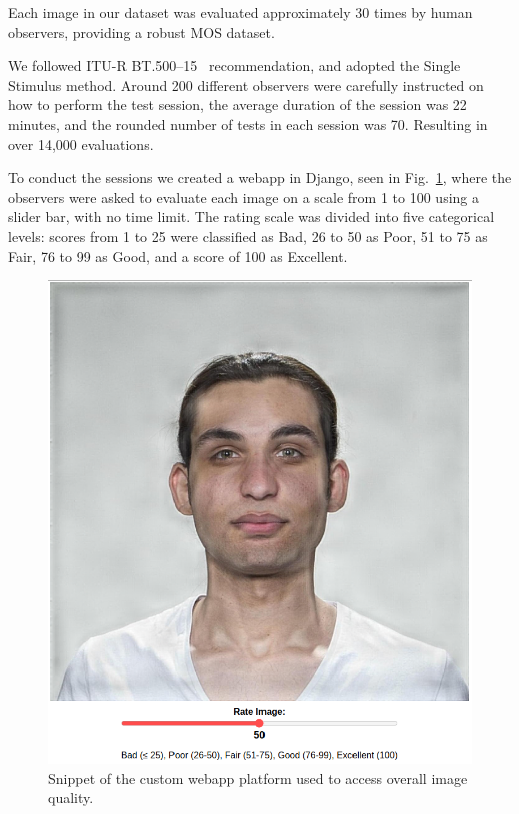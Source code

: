 Each image in our dataset was evaluated approximately 30 times by human observers, providing a robust MOS dataset.

We followed ITU-R BT.500--15~\cite{ITU-R-BT500} recommendation, and adopted the Single Stimulus method. Around 200 different observers were carefully instructed on how to perform the test session, the average duration of the session was 22 minutes, and the rounded number of tests in each session was 70. Resulting in over 14,000 evaluations.

To conduct the sessions we created a webapp in Django, seen in Fig.~\ref{fig:platform}, where the observers were asked to evaluate each image on a scale from 1 to 100 using a slider bar, with no time limit. The rating scale was divided into five categorical levels: scores from 1 to 25 were classified as Bad, 26 to 50 as Poor, 51 to 75 as Fair, 76 to 99 as Good, and a score of 100 as Excellent.

\begin{figure}
    \centering
    \includegraphics[width=0.4\linewidth]{images/webapp.png}
    \caption{Snippet of the custom webapp platform used to access overall image quality.}\label{fig:platform}
\end{figure}



